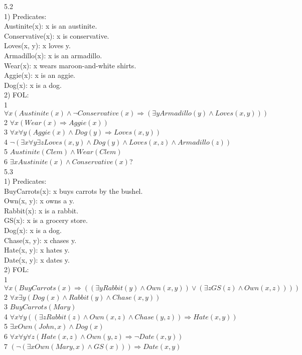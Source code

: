 \documentclass[a4paper]{article}
\begin{document}
5.2\\
1) Predicates:\\
Austinite(x): x is an austinite.\\
Conservative(x): x is conservative.\\
Loves(x, y): x loves y.\\
Armadillo(x): x is an armadillo.\\
Wear(x): x wears maroon-and-white shirts.\\
Aggie(x): x is an aggie.\\
Dog(x): x is a dog.\\

2) FOL:\\
1 $\forall x (Austinite(x) \wedge \neg Conservative(x) \Rightarrow (\exists y Armadillo(y) \wedge Loves(x,y)))$\\
2 $\forall x (Wear(x) \Rightarrow Aggie(x))$\\
3 $\forall x \forall y (Aggie(x) \wedge Dog(y) \Rightarrow Loves(x, y))$\\
4 $\neg (\exists x \forall y \exists z Loves(x, y) \wedge Dog(y) \wedge Loves(x, z)\wedge Armadillo(z))$\\
5 $Austinite(Clem) \wedge Wear(Clem)$\\
6 $\exists x Austinite(x) \wedge Conservative(x)$?\\

5.3\\
1) Predicates:\\
BuyCarrots(x): x buys carrots by the bushel.\\
Own(x, y): x owns a y.\\
Rabbit(x): x is a rabbit.\\
GS(x): x is a grocery store.\\
Dog(x): x is a dog.\\
Chase(x, y): x chases y.\\
Hate(x, y): x hates y.\\
Date(x, y): x dates y.\\

2) FOL:\\
1 $\forall x (BuyCarrots(x) \Rightarrow ((\exists y Rabbit(y) \wedge Own(x, y)) \vee (\exists z GS(z) \wedge Own(x, z)) ))$\\
2 $\forall x \exists y (Dog(x) \wedge Rabbit(y) \wedge Chase(x, y))$\\
3 $BuyCarrots(Mary)$\\
4 $\forall x \forall y ((\exists z Rabbit(z) \wedge Own(x, z) \wedge Chase(y, z)) \Rightarrow Hate(x, y))$\\
5 $\exists x Own(John, x) \wedge Dog(x)$\\
6 $\forall x \forall y \forall z (Hate(x, z) \wedge Own(y, z) \Rightarrow \neg Date(x, y))$\\
7 $(\neg (\exists x Own(Mary, x) \wedge GS(x))) \Rightarrow Date(x, y)$\\
\end{document}

